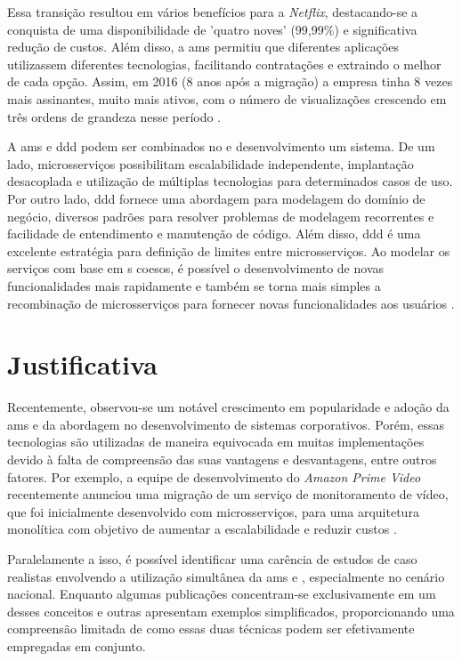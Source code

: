 Essa transição resultou em vários benefícios para a \emph{Netflix}, destacando-se a conquista de uma disponibilidade de 'quatro noves' (99,99\%) e significativa redução de custos. Além disso, a \acrfull{ams} permitiu que diferentes aplicações utilizassem diferentes tecnologias, facilitando contratações e extraindo o melhor de cada opção. Assim, em 2016 (8 anos após a migração) a empresa tinha 8 vezes mais assinantes, muito mais ativos, com o número de visualizações crescendo em três ordens de grandeza nesse período \cite{netflixMigration}.

A \acrfull{ams} e \acrshort{ddd} podem ser combinados no  e desenvolvimento um sistema. De um lado, microsserviços possibilitam escalabilidade independente, implantação desacoplada e utilização de múltiplas tecnologias para determinados casos de uso. Por outro lado, \acrshort{ddd} fornece uma abordagem para modelagem do domínio de negócio, diversos padrões para resolver problemas de modelagem recorrentes e facilidade de entendimento e manutenção de código. Além disso, \acrshort{ddd} é uma excelente estratégia para definição de limites entre microsserviços. Ao modelar os serviços com base em s coesos, é possível o desenvolvimento de novas funcionalidades mais rapidamente e também se torna mais simples a recombinação de microsserviços para fornecer novas funcionalidades aos usuários \cite{buildingMicroservices}.

\section{Justificativa}

Recentemente, observou-se um notável crescimento em popularidade e adoção da \acrshort{ams} e da abordagem  no desenvolvimento de sistemas corporativos. Porém, essas tecnologias são utilizadas de maneira equivocada em muitas implementações devido à falta de compreensão das suas vantagens e desvantagens, entre outros fatores. Por exemplo, a equipe de desenvolvimento do \emph{Amazon Prime Video} recentemente anunciou uma migração de um serviço de monitoramento de vídeo, que foi inicialmente desenvolvido com microsserviços, para uma arquitetura monolítica com objetivo de aumentar a escalabilidade e reduzir custos \cite{amazonBackMigration}.

Paralelamente a isso, é possível identificar uma carência de estudos de caso realistas envolvendo a utilização simultânea da \acrshort{ams} e , especialmente no cenário nacional.  Enquanto algumas publicações concentram-se exclusivamente em um desses conceitos e outras apresentam exemplos simplificados, proporcionando uma compreensão limitada de como essas duas técnicas podem ser efetivamente empregadas em conjunto. 


